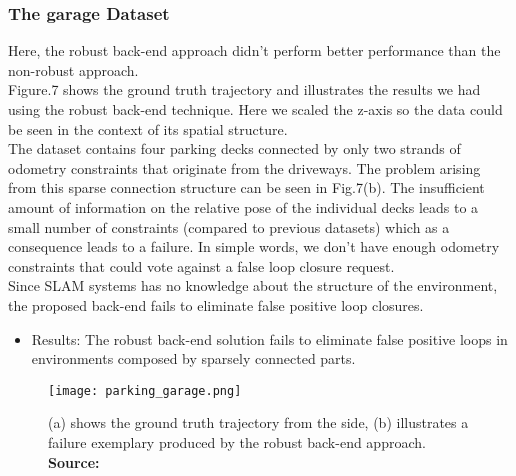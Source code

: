 \documentclass[9pt,technote]{IEEEtran}
\newcommand*{\captionsource}[2]{%
  \caption[{#1}]{%
    #1%
    \\\hspace{\linewidth}%
    \textbf{Source:} #2%
  }%
}
\begin{document}
\subsubsection{The garage Dataset}
Here, the robust back-end approach didn't perform better performance than the non-robust approach.\\
Figure.7 shows the ground truth trajectory and illustrates the results we had using the robust back-end technique.
Here we scaled the z-axis so the data could be seen in the context of its spatial structure.\\
The dataset contains four parking decks connected by only two strands of odometry constraints that originate from the driveways.
The problem arising from this sparse connection structure can be seen in Fig.7(b).
The insufficient amount of information on the relative pose of the individual decks leads to a small number of constraints (compared to previous datasets) which as a consequence leads to a failure. In simple words, we don't have enough odometry constraints that could vote against a false loop closure request.\\
Since SLAM systems has no knowledge about the structure of the environment, the proposed back-end fails to eliminate false positive loop closures.
\begin{itemize}
\item Results: The robust back-end solution fails to eliminate false positive loops in environments composed by sparsely connected parts. 
\end{itemize}    

\begin{figure}
[h!]
\centering
\texttt{[image: parking\_garage.png]}
\captionsource{(a) shows the ground
truth trajectory from the side, (b) illustrates a failure exemplary produced by the robust back-end approach.   
}{\cite{sunderhauf2012switchable}}
\end{figure}
\end{document}
